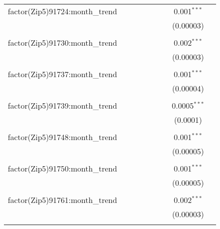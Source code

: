 \begin{table}[H]
{\begin{tabular}{@{\extracolsep{5pt}}lcccccccc}
  factor(Zip5)91724:month\_trend &  &  &  &  &  &  & 0.001$^{***}$ &  \\  

   &  &  &  &  &  &  & (0.00003) &  \\  

   & & & & & & & & \\  

  factor(Zip5)91730:month\_trend &  &  &  &  &  &  & 0.002$^{***}$ &  \\  

   &  &  &  &  &  &  & (0.00003) &  \\  

   & & & & & & & & \\  

  factor(Zip5)91737:month\_trend &  &  &  &  &  &  & 0.001$^{***}$ &  \\  

   &  &  &  &  &  &  & (0.00004) &  \\  

   & & & & & & & & \\  

  factor(Zip5)91739:month\_trend &  &  &  &  &  &  & 0.0005$^{***}$ &  \\  

   &  &  &  &  &  &  & (0.0001) &  \\  

   & & & & & & & & \\  

  factor(Zip5)91748:month\_trend &  &  &  &  &  &  & 0.001$^{***}$ &  \\  

   &  &  &  &  &  &  & (0.00005) &  \\  

   & & & & & & & & \\  

  factor(Zip5)91750:month\_trend &  &  &  &  &  &  & 0.001$^{***}$ &  \\  

   &  &  &  &  &  &  & (0.00005) &  \\  

   & & & & & & & & \\  

  factor(Zip5)91761:month\_trend &  &  &  &  &  &  & 0.002$^{***}$ &  \\  

   &  &  &  &  &  &  & (0.00003) &  \\  

   & & & & & & & & \\  


\end{tabular}}
\end{table}
